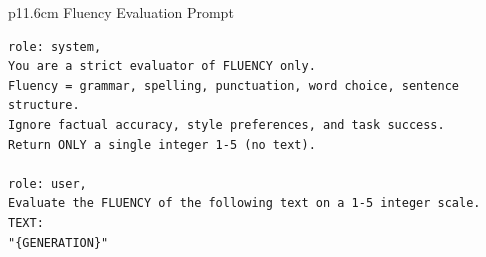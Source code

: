 \begin{table}[h]

\centering
\begin{tabular}{p{11.6cm}}
    \toprule
     {Fluency Evaluation Prompt} \\
    
    \midrule
    \scriptsize
    \begin{verbatim}
role: system,
You are a strict evaluator of FLUENCY only. 
Fluency = grammar, spelling, punctuation, word choice, sentence structure. 
Ignore factual accuracy, style preferences, and task success. 
Return ONLY a single integer 1-5 (no text).

role: user,
Evaluate the FLUENCY of the following text on a 1-5 integer scale. 
TEXT:
"{GENERATION}"\end{verbatim}\\
\bottomrule
\end{tabular}
\caption{The fluency evaluation prompt used with Gemma-3-27B-it}
\label{tab:fluency_prompt}
\end{table}